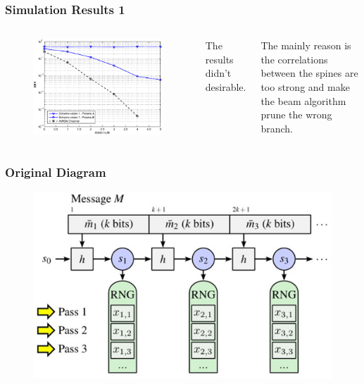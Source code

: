 \documentclass{beamer}
\begin{document}
\begin{frame}
\frametitle{Simulation Results 1}
\begin{columns}[c]
\begin{figure}
\includegraphics[width=.99\textwidth]{figure_vision1.eps}%
\end{figure}
The results didn't desirable. 

The mainly reason is the correlations between the spines are too strong and make the beam algorithm prune the wrong branch.
\end{columns}

\end{frame}

\begin{frame}
\frametitle{Original Diagram}
\begin{figure}
\includegraphics[width=0.9\linewidth]{diagram1.eps}
\end{figure}
\end{frame}
\end{document}
